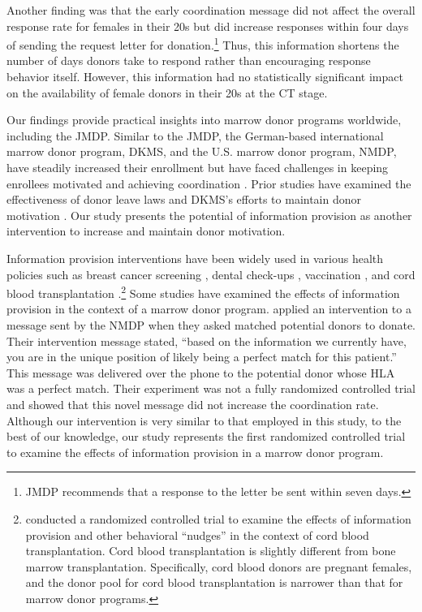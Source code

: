 \documentclass[12pt, a4paper]{article}
\begin{document}
Another finding was that the early coordination message did not affect the overall response rate for females in their 20s but did increase responses within four days of sending the request letter for donation.\footnote{JMDP recommends that a response to the letter be sent within seven days.} Thus, this information shortens the number of days donors take to respond rather than encouraging response behavior itself. However, this information had no statistically significant impact on the availability of female donors in their 20s at the CT stage.

Our findings provide practical insights into marrow donor programs worldwide, including the JMDP. Similar to the JMDP, the German-based international marrow donor program, DKMS, and the U.S. marrow donor program, NMDP, have steadily increased their enrollment but have faced challenges in keeping enrollees motivated and achieving coordination \citep{Switzer1999, Switzer2004, Haylock2024}. Prior studies have examined the effectiveness of donor leave laws \citep{Lacetera2014} and DKMS's efforts to maintain donor motivation \citep{Haylock2024}. Our study presents the potential of information provision as another intervention to increase and maintain donor motivation.

Information provision interventions have been widely used in various health policies such as breast cancer screening \citep{Bertoni2020}, dental check-ups \citep{Altmann2014}, vaccination \citep[e.g.,][]{Dai2021, Milkman2021}, and cord blood transplantation \citep{Grieco2018}.\footnote{\citet{Grieco2018} conducted a randomized controlled trial to examine the effects of information provision and other behavioral ``nudges'' in the context of cord blood transplantation. Cord blood transplantation is slightly different from bone marrow transplantation. Specifically, cord blood donors are pregnant females, and the donor pool for cord blood transplantation is narrower than that for marrow donor programs.} Some studies have examined the effects of information provision in the context of a marrow donor program. \citet{Switzer2018} applied an intervention to a message sent by the NMDP when they asked matched potential donors to donate. Their intervention message stated, ``based on the information we currently have, you are in the unique position of likely being a perfect match for this patient.'' This message was delivered over the phone to the potential donor whose HLA was a perfect match. Their experiment was not a fully randomized controlled trial and showed that this novel message did not increase the coordination rate. Although our intervention is very similar to that employed in this study, to the best of our knowledge, our study represents the first randomized controlled trial to examine the effects of information provision in a marrow donor program.
\end{document}
